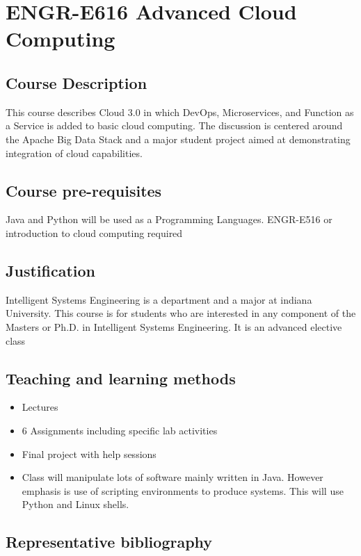 \section{ENGR-E616 Advanced Cloud Computing}

\subsection{Course Description }

This course describes Cloud 3.0 in which DevOps, Microservices, and
Function as a Service is added to basic cloud computing. The
discussion is centered around the Apache Big Data Stack and a major
student project aimed at demonstrating integration of cloud
capabilities.

\subsection{Course pre-requisites}

Java and Python will be used as a Programming Languages. ENGR-E516 or
introduction to cloud computing required

\subsection{Justification}

Intelligent Systems Engineering is a department and a major at indiana
University. This course is for students who are interested in any
component of the Masters or Ph.D. in Intelligent Systems Engineering.
It is an advanced elective class


\subsection{Teaching and learning methods}

\begin{itemize}
\item	Lectures
\item	6 Assignments including specific lab activities
\item	Final project with help sessions
\item	Class will manipulate lots of software mainly written in Java. However emphasis is use of scripting environments to produce systems. This will use Python and Linux shells.
\end{itemize}

\subsection{Representative bibliography}

